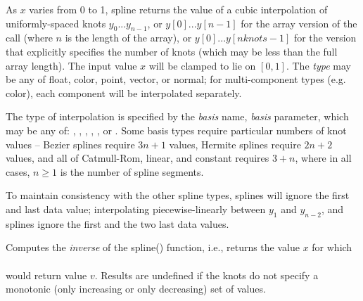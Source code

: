 \documentclass[11pt,letterpaper]{book}
\def\color{{\cf color}\xspace}
\def\float{{\cf float}\xspace}
\def\normal{{\cf normal}\xspace}
\def\point{{\cf point}\xspace}
\def\vector{{\cf vector}\xspace}
\begin{document}

As $x$ varies from 0 to 1, {\cf spline} returns the value of a cubic
interpolation of uniformly-spaced knots $y_0$...$y_{n-1}$, or
$y[0]$...$y[n-1]$ for the array version of the call (where $n$ is the
length of the array), or $y[0]$...$y[nknots-1]$ for the version that
explicitly specifies the number of knots (which may be less than the
full array length).  The input value $x$ will be clamped to lie
on $[0,1]$.  The \emph{type} may be any of \float, \color,
\point, \vector, or \normal; for multi-component types (e.g. \color),
each component will be interpolated separately.

The type of interpolation is specified by the \emph{basis} name,
\emph{basis} parameter, which may be any of: ,
, , , , or 
. Some basis
types require particular numbers of knot values -- Bezier splines
require $3n+1$ values, Hermite splines require $2n+2$ values, and all of
Catmull-Rom, linear, and constant requires $3+n$, where in all cases,
$n \ge 1$ is the number of spline segments.

To maintain consistency with the other spline types,  splines will
ignore the first and last data value; interpolating piecewise-linearly
between $y_1$ and $y_{n-2}$, and  splines ignore the first
and the two last data values.
\apiend


Computes the \emph{inverse} of the {\cf spline()} function, i.e., returns
the value $x$ for which \\
   \\ 
would return value
$v$.  Results are undefined if the knots do not specify a monotonic
(only increasing or only decreasing) set of values.
\end{document}
